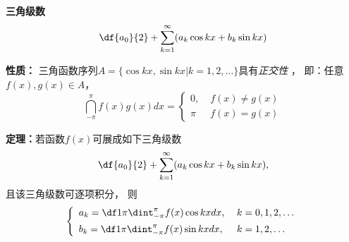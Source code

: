 \begin{center}
	\quad
\end{center}

{\bf 三角级数}
$${\df{a_0}{2}+\sum\limits_{k=1}^{\infty}(a_k\cos kx
+b_k\sin kx)}$$ 

{\bf 性质：}
三角函数序列$A=\{\cos kx,\sin kx|k=1,2,\ldots\}$具有{\it 正交性} ，
即：任意$f(x),g(x)\in A$，
$$\dint_{-\pi}^{\pi}f(x)g(x)dx=\left\{\begin{array}{ll}
0,\;& f(x)\ne g(x)\\ \pi\;& f(x)=g(x)
\end{array}\right.$$

{\bf 定理：}若函数$f(x)$可展成如下三角级数
$$\df{a_0}{2}+\sum\limits_{k=1}^{\infty}(a_k\cos kx+b_k\sin kx),$$
且该三角级数可逐项积分， 则
$$\left\{\begin{array}{ll}
a_k=\df1{\pi}\dint_{-\pi}^{\pi}f(x)\cos kxdx,\;& k=0,1,2,\ldots\\[5pt]
b_k=\df1{\pi}\dint_{-\pi}^{\pi}f(x)\sin kxdx,\;& k=1,2,\ldots
\end{array}\right.$$

